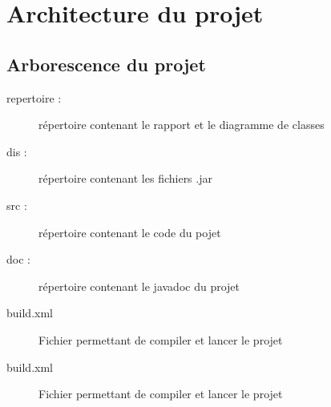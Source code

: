 \chapter{Architecture du projet}

	\section{Arborescence du projet}

		\begin{description}
            \item[repertoire :]{répertoire contenant le rapport et le diagramme de classes}
            \item[dis :]{répertoire contenant les fichiers .jar}
            \item[src :]{répertoire contenant le code du pojet}
            \item[doc :]{répertoire contenant le javadoc du projet}
            \item[build.xml]{Fichier permettant de compiler et lancer le projet}
            \item[build.xml]{Fichier permettant de compiler et lancer le projet}
		\end{description}
